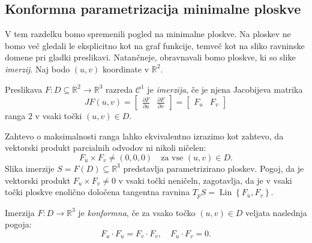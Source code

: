 \documentclass[fin1, tisk, bibtex]{fmfdelo}
\begin{document}
\subsection{Konformna parametrizacija minimalne ploskve}

V tem razdelku bomo spremenili pogled na minimalne ploskve. Na ploskev ne bomo več gledali le eksplicitno kot na graf funkcije, temveč kot na sliko ravninske domene pri gladki preslikavi. Natančneje, obravnavali bomo ploskve, ki so slike \emph{imerzij}. Naj bodo $(u, v)$ koordinate v $\mathbb{R}^2$. 

\begin{definicija}
    Preslikava $F: D \subseteq \mathbb{R}^2 \rightarrow \mathbb{R}^3$ razreda $\mathcal{C}^1$ je \emph{imerzija}, če je njena Jacobijeva matrika
    \begin{equation*}
        JF(u,v) = \begin{bmatrix} \frac{\partial F}{\partial u} & \frac{\partial F}{\partial v} \end{bmatrix} = \begin{bmatrix} F_u & F_v \end{bmatrix} 
    \end{equation*}
    ranga $2$ v vsaki točki $(u,v) \in D$.
\end{definicija}

Zahtevo o maksimalnosti ranga lahko ekvivalentno izrazimo kot zahtevo, da vektorski produkt parcialnih odvodov ni nikoli ničelen:
\begin{equation*}
    F_u \times F_v \neq (0,0,0) \quad \text {za vse }(u, v) \in D .    
\end{equation*}
Slika imerzije $S=F(D) \subseteq\mathbb{R}^3$ predstavlja parametrizirano ploskev. Pogoj, da je vektorski produkt $F_u \times F_v \neq 0$ v vsaki točki neničeln, zagotavlja, da je v vsaki točki ploskve enolično določena tangentna ravnina $T_pS=\operatorname{Lin}\left\{F_u, F_v\right\}$.


\begin{definicija}
    Imerzija $F: D \rightarrow \mathbb{R}^3$ je \emph{konformna}, če za vsako točko $(u, v) \in D$ veljata naslednja pogoja:
    \begin{equation}
        F_u \cdot F_u=F_v \cdot F_v, \quad F_u \cdot F_v=0. \label{eq:konformnost}
    \end{equation}
\end{definicija}
\end{document}
